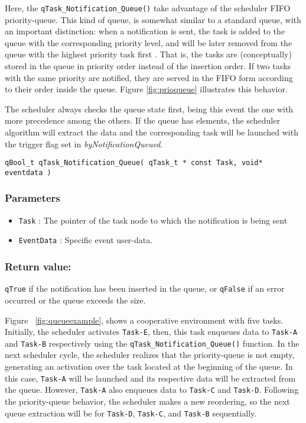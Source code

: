 Here, the \lstinline{qTask_Notification_Queue()}  take advantage of the scheduler FIFO priority-queue. 
This kind of queue, is somewhat similar to a standard queue, with an important distinction: when a notification is sent, the task is added to the queue with the corresponding priority level, and will be later removed from the queue with the highest priority task first  \cite{cormen}. That is, the tasks are (conceptually) stored in the queue in priority order instead of the insertion order. If two tasks with the same priority are notified, they are served in the FIFO form according to their order inside the queue. Figure \ref{fig:prioqueue} illustrates this behavior.



The scheduler always checks the queue state first, being this event the one with more precedence among the others. If the queue has elements, the scheduler algorithm will extract the data and the corresponding task will be launched with the trigger flag set in \textit{byNotificationQueued}. 
\medskip

\begin{lstlisting}[style=CStyle]
qBool_t qTask_Notification_Queue( qTask_t * const Task, void* eventdata )
\end{lstlisting}

\subsubsection*{Parameters}
\begin{itemize}
    \item \lstinline{Task} : The pointer of the task node to which the notification is being sent 
    \item \lstinline{EventData} : Specific event user-data. 
\end{itemize}

\subsubsection*{Return value:}

\lstinline{qTrue} if the notification  has been inserted in the queue, or \lstinline{qFalse} if an error occurred or the queue exceeds the size. 

\hrulefill
\medskip

Figure ~\ref{fig:queueexample}, shows a cooperative environment with five tasks. Initially, the scheduler activates \lstinline{Task-E}, then, this task enqueues data to \lstinline{Task-A} and \lstinline{Task-B} respectively using the \lstinline{qTask_Notification_Queue()} function. In the next scheduler cycle, the scheduler realizes that the priority-queue is not empty, generating an activation over the task located at the beginning of the queue. In this case, \lstinline{Task-A} will be launched and its respective data will be extracted from the queue. However, \lstinline{Task-A} also enqueues data to \lstinline{Task-C} and \lstinline{Task-D}. Following the priority-queue behavior, the scheduler makes a new reordering, so the next queue extraction will be for \lstinline{Task-D}, \lstinline{Task-C}, and \lstinline{Task-B} sequentially.

